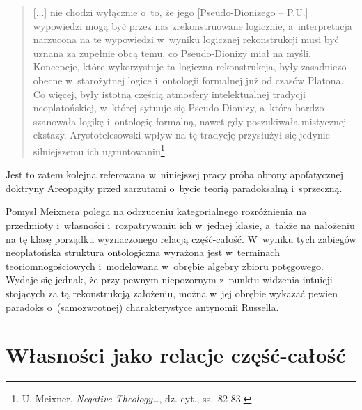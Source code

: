 \begin{quote}
[...] nie chodzi wyłącznie o~to, że jego [Pseudo-Dionizego -- P.U.] wypowiedzi mogą być przez nas zrekonstruowane logicznie, a~interpretacja narzucona na te wypowiedzi w~wyniku logicznej rekonstrukcji musi być uznana za zupełnie obcą temu, co Pseudo-Dionizy miał na myśli. Koncepcje, które wykorzystuje ta logiczna rekonstrukcja, były zasadniczo obecne w~starożytnej logice i~ontologii formalnej już od czasów Platona. Co więcej, były istotną częścią atmosfery intelektualnej tradycji neoplatońskiej, w~której sytuuje się Pseudo-Dionizy, a~która bardzo szanowała logikę i~ontologię formalną, nawet gdy poszukiwała mistycznej ekstazy. Arystotelesowski wpływ na tę tradycję przysłużył się jedynie silniejszemu ich ugruntowaniu\footnote{U. Meixner, \textit{Negative Theology}\ldots, dz. cyt., ss.~82-83.}.
\end{quote}
Jest to zatem kolejna referowana w~niniejszej pracy próba obrony apofatycznej doktryny Areopagity przed zarzutami o~bycie teorią paradoksalną i~sprzeczną.

Pomysł Meixnera polega na odrzuceniu kategorialnego rozróżnienia na przedmioty i~własności i~rozpatrywaniu ich w~jednej klasie, a~także na nałożeniu na tę klasę porządku wyznaczonego relacją część-całość. W~wyniku tych zabiegów neoplatońska struktura ontologiczna wyrażona jest w~terminach teoriomnogościowych i~modelowana w~obrębie algebry zbioru potęgowego. Wydaje się jednak, że przy pewnym niepozornym z~punktu widzenia intuicji stojących za tą rekonstrukcją założeniu, można w~jej obrębie wykazać pewien paradoks o~(samozwrotnej) charakterystyce antynomii Russella.

\section{Własności jako relacje część-całość}

